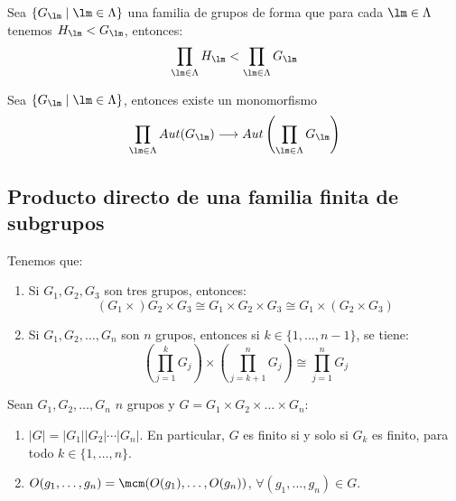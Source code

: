\begin{teo}
    Sea $\{G_\lm \mid \lm \in \Lambda\}$ una familia de grupos de forma que para cada $\lm\in \Lambda$ tenemos $H_\lm < G_\lm$, entonces:
    \begin{equation*}
        \prod_{\lm\in \Lambda} H_\lm < \prod_{\lm\in \Lambda} G_\lm
    \end{equation*}
\end{teo}

\begin{teo}
    Sea $\{G_\lm \mid \lm \in \Lambda\}$, entonces existe un monomorfismo
    \begin{equation*}
        \prod_{\lm\in \Lambda}Aut(G_\lm) \longrightarrow Aut\left(\prod_{\lm\in \Lambda} G_\lm\right)
    \end{equation*}
\end{teo}

\subsection{Producto directo de una familia finita de subgrupos}

\begin{teo}
    Tenemos que:
    \begin{enumerate}
        \item Si $G_1,G_2,G_3$ son tres grupos, entonces:
            \begin{equation*}
                (G_1\times )G_2 \times G_3 \cong G_1 \times G_2 \times G_3 \cong G_1\times (G_2\times G_3)
            \end{equation*}
        \item Si $G_1,G_2,\ldots,G_n$ son $n$ grupos, entonces si $k\in \{1,\ldots,n-1\}$, se tiene:
            \begin{equation*}
                \left(\prod_{j=1}^{k}G_j\right) \times \left(\prod_{j=k+1}^{n}G_j\right) \cong \prod_{j=1}^{n}G_j
            \end{equation*}
    \end{enumerate}
\end{teo}

\begin{teo}
    Sean $G_1,G_2,\ldots,G_n$ $n$ grupos y $G = G_1\times G_2 \times \ldots \times G_n$:
    \begin{enumerate}
        \item $|G| = |G_1| |G_2| \cdots |G_n| $. En particular, $G$ es finito si y solo si $G_k$ es finito, para todo $k\in \{1,\ldots,n\}$.
        \item $O(g_1,\ldots,g_n) = \mcm(O(g_1), \ldots, O(g_n))$, $\forall (g_1,\ldots,g_n)\in G$.
    \end{enumerate}
\end{teo}

